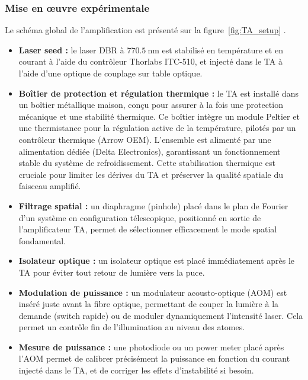 \subsubsection*{Mise en œuvre expérimentale}

Le schéma global de l’amplification est présenté sur la figure~\ref{fig:TA_setup} .

\begin{itemize}[label=$\triangleright$]
    \item \textbf{Laser seed :} le laser DBR à $770.5~\text{nm}$ est stabilisé en température et en courant à l’aide du contrôleur Thorlabs ITC-510, et injecté dans le TA à l’aide d’une optique de couplage sur table optique.
    
    \item \textbf{Boîtier de protection et régulation thermique :} le TA est installé dans un boîtier métallique maison, conçu pour assurer à la fois une protection mécanique et une stabilité thermique. Ce boîtier intègre un module Peltier et une thermistance pour la régulation active de la température, pilotés par un contrôleur thermique (Arrow OEM). L’ensemble est alimenté par une alimentation dédiée (Delta Electronics), garantissant un fonctionnement stable du système de refroidissement. Cette stabilisation thermique est cruciale pour limiter les dérives du TA et préserver la qualité spatiale du faisceau amplifié.

    \item \textbf{Filtrage spatial :} un diaphragme (pinhole) placé dans le plan de Fourier d’un système en configuration télescopique, positionné en sortie de l’amplificateur TA, permet de sélectionner efficacement le mode spatial fondamental.

    \item \textbf{Isolateur optique :} un isolateur optique est placé immédiatement après le TA pour éviter tout retour de lumière vers la puce.

    \item \textbf{Modulation de puissance :} un modulateur acousto-optique (AOM) est inséré juste avant la fibre optique, permettant de couper la lumière à la demande (switch rapide) ou de moduler dynamiquement l’intensité laser. Cela permet un contrôle fin de l’illumination au niveau des atomes.
    
    \item \textbf{Mesure de puissance :} une photodiode ou un power meter placé après l’AOM permet de calibrer précisément la puissance en fonction du courant injecté dans le TA, et de corriger les effets d’instabilité si besoin.
\end{itemize}

